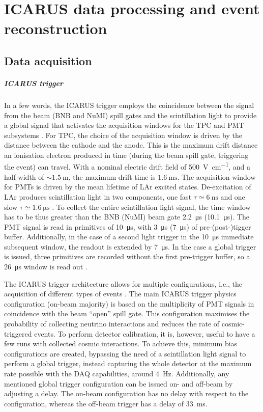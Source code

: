 
\chapter{ICARUS data processing and event reconstruction}
\label{chap:event_reconstruction}

\section{Data acquisition} \label{sec:DAQ}


\paragraph{ICARUS trigger} In a few words, the ICARUS trigger employs the coincidence between the signal from the beam (BNB and NuMI) spill gates and the scintillation light to provide a global signal that activates  the acquisition windows for the TPC and PMT subsystems \cite{ICARUS:2025kai}. For TPC, the choice of the acquisition window is driven by the distance between the cathode and the anode. This is the maximum drift distance an ionisation electron produced in time (during the beam spill gate, triggering the event) can travel. With a nominal electric drift field of \SI{500}{\volt\per\cm}, and a half-width of $\sim\SI{1.5}{\m}$, the maximum drift time is $\SI{1.6}{\ms}$. The acquisition window for PMTs is driven by the mean lifetime of LAr excited states. De-excitation of LAr produces scintillation light in two components, one fast $\tau\simeq \SI{6}{\ns}$ and one slow $\tau\simeq\SI{1.6}{\us}$ \cite{Segreto:2020qks}. To collect the entire scintillation light signal, the time window has to be thus greater than the BNB (NuMI) beam gate \SI{2.2}{\us} (\SI{10.1}{\us}). The PMT signal is read in primitives of \SI{10}{\us}, with \SI{3}{\us} (\SI{7}{\us}) of pre-(post-)tigger buffer.  Additionally, in the case of a second light trigger in the \SI{10}{\us} immediate subsequent window, the readout is extended by \SI{7}{\us}. In the case a global trigger is issued, three primitives are recorded without the first pre-trigger buffer, so a \SI{26}{\us} window is read out \cite{ICARUS:2025kai}. 

The ICARUS trigger architecture allows for multiple configurations, i.e., the acquisition of different types of events \cite{ICARUS:2025kai}. The main ICARUS trigger physics configuration (on-beam majority) is based on the multiplicity of PMT signals in coincidence with the beam ``open'' spill gate. This configuration maximises the probability of collecting neutrino interactions and reduces the rate of cosmic-triggered events. To perform detector calibration, it is, however, useful to have a few runs with collected cosmic interactions. To achieve this, minimum bias configurations are created, bypassing the need of a scintillation light signal to perform a global trigger, instead capturing the whole detector at the maximum rate possible with the DAQ capabilities, around \SI{4}{\hertz}. Additionally, any mentioned global trigger configuration can be issued on- and off-beam by adjusting a delay. The on-beam configuration has no delay with respect to the configuration, whereas the off-beam trigger has a delay of \SI{+33}{\ms}. 

